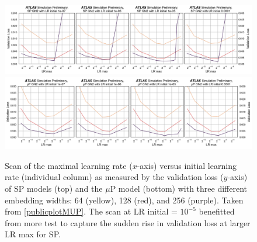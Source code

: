 \begin{figure}[h!]
  \centering
  \includegraphics[width=\textwidth]{Images/FTAG/GN/HPO/fullSP2.png}\\
  \includegraphics[width=\textwidth]{Images/FTAG/GN/HPO/fullmup2.png}
  \caption{Scan of the maximal learning rate ($x$-axis) versus initial learning rate (individual column) as measured by the validation loss ($y$-axis) of SP models (top) and the $\mu$P model (bottom) with three different embedding widths: 64 (yellow), 128 (red), and 256 (purple). Taken from \ref{publicplotMUP}. The scan at LR initial = $10^{-5}$ benefitted from more test to capture the sudden rise in validation loss at larger LR max for SP.}
  \label{fig:fullSPmup}
\end{figure} 

